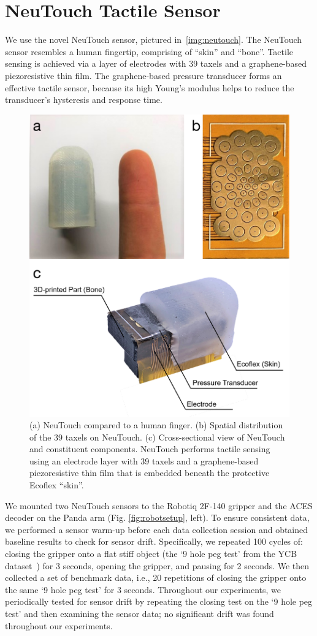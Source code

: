\documentclass[fyp]{socreport}
\begin{document}
\section{NeuTouch Tactile Sensor}
We use the novel NeuTouch sensor, pictured in~\autoref{img:neutouch}. The
NeuTouch sensor resembles a human fingertip, comprising of ``skin'' and
``bone''. Tactile sensing is achieved via a layer of electrodes with 39 taxels
and a graphene-based piezoresistive thin film. The graphene-based pressure
transducer forms an effective tactile sensor, because its high Young's modulus
helps to reduce the transducer's hysteresis and response time.

\begin{figure}
\centering
\includegraphics[width=0.86\columnwidth]{images/spktac}
\caption{(a) NeuTouch compared to a human finger. (b) Spatial distribution of
  the 39 taxels on NeuTouch. (c) Cross-sectional view of NeuTouch and
  constituent components. NeuTouch performs tactile sensing using an electrode
  layer with 39 taxels and a graphene-based piezoresistive thin film that is
  embedded beneath the protective Ecoflex ``skin''.}
\label{img:neutouch}
\end{figure}

We mounted two NeuTouch sensors to the Robotiq 2F-140 gripper and the ACES
decoder on the Panda arm (Fig. \ref{fig:robotsetup}, left). To ensure consistent
data, we performed a sensor warm-up before each data collection session and
obtained baseline results to check for sensor drift. Specifically, we repeated
100 cycles of: closing the gripper onto a flat stiff object (the `9 hole peg
test' from the YCB dataset~\cite{ycb2015}) for 3 seconds, opening the gripper,
and pausing for 2 seconds. We then collected a set of benchmark data, i.e., 20
repetitions of closing the gripper onto the same `9 hole peg test' for 3
seconds. Throughout our experiments, we periodically tested for sensor drift by
repeating the closing test on the `9 hole peg test' and then examining the
sensor data; no significant drift was found throughout our experiments.
\end{document}
